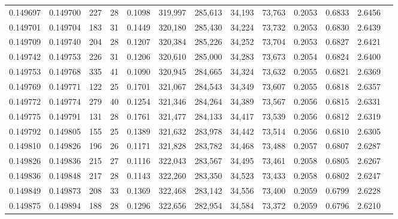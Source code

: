 \begin{tabular}{rrrrrrrrrrrrr}
0.149697 & 0.149700 &   227 &  28 &                                     0.1098 & 319,997 & 285,613 &  34,193 &  73,763 & 0.2053 & 0.6833 & 2.6456 \\
0.149701 & 0.149704 &   183 &  31 &                                     0.1449 & 320,180 & 285,430 &  34,224 &  73,732 & 0.2053 & 0.6830 & 2.6439 \\
0.149709 & 0.149740 &   204 &  28 &                                     0.1207 & 320,384 & 285,226 &  34,252 &  73,704 & 0.2053 & 0.6827 & 2.6421 \\
0.149742 & 0.149753 &   226 &  31 &                                     0.1206 & 320,610 & 285,000 &  34,283 &  73,673 & 0.2054 & 0.6824 & 2.6400 \\
0.149753 & 0.149768 &   335 &  41 &                                     0.1090 & 320,945 & 284,665 &  34,324 &  73,632 & 0.2055 & 0.6821 & 2.6369 \\
0.149769 & 0.149771 &   122 &  25 &                                     0.1701 & 321,067 & 284,543 &  34,349 &  73,607 & 0.2055 & 0.6818 & 2.6357 \\
0.149772 & 0.149774 &   279 &  40 &                                     0.1254 & 321,346 & 284,264 &  34,389 &  73,567 & 0.2056 & 0.6815 & 2.6331 \\
0.149775 & 0.149791 &   131 &  28 &                                     0.1761 & 321,477 & 284,133 &  34,417 &  73,539 & 0.2056 & 0.6812 & 2.6319 \\
0.149792 & 0.149805 &   155 &  25 &                                     0.1389 & 321,632 & 283,978 &  34,442 &  73,514 & 0.2056 & 0.6810 & 2.6305 \\
0.149810 & 0.149826 &   196 &  26 &                                     0.1171 & 321,828 & 283,782 &  34,468 &  73,488 & 0.2057 & 0.6807 & 2.6287 \\
0.149826 & 0.149836 &   215 &  27 &                                     0.1116 & 322,043 & 283,567 &  34,495 &  73,461 & 0.2058 & 0.6805 & 2.6267 \\
0.149836 & 0.149848 &   217 &  28 &                                     0.1143 & 322,260 & 283,350 &  34,523 &  73,433 & 0.2058 & 0.6802 & 2.6247 \\
0.149849 & 0.149873 &   208 &  33 &                                     0.1369 & 322,468 & 283,142 &  34,556 &  73,400 & 0.2059 & 0.6799 & 2.6228 \\
0.149875 & 0.149894 &   188 &  28 &                                     0.1296 & 322,656 & 282,954 &  34,584 &  73,372 & 0.2059 & 0.6796 & 2.6210 \\

\end{tabular}
